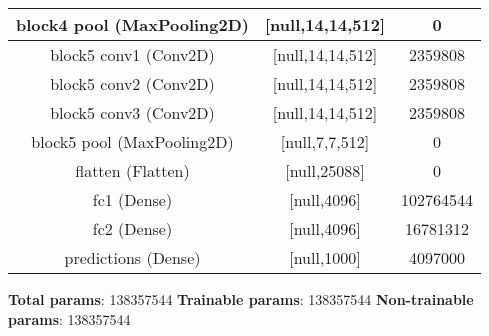 \begin{table}[!t]
\begin{tabular}{|c|c|c|}
    block4 pool (MaxPooling2D) & [null,14,14,512] & 0 \\
    \hline
    
    block5 conv1 (Conv2D) & [null,14,14,512] & 2359808 \\
    \hline
    
    block5 conv2 (Conv2D) & [null,14,14,512] & 2359808 \\
    \hline
    
    block5 conv3 (Conv2D) & [null,14,14,512] & 2359808 \\
    \hline
    
    block5 pool (MaxPooling2D) & [null,7,7,512] & 0 \\
    \hline
    
    flatten (Flatten) & [null,25088] & 0 \\
    \hline
    
    fc1 (Dense) & [null,4096] & 102764544 \\
    \hline
    
    fc2 (Dense) & [null,4096] & 16781312 \\
    \hline
    
    predictions (Dense) & [null,1000] & 4097000 \\
    \hline

  \end{tabular}

\end{table}

\linebreak
\textbf{Total params}: 138357544 \newline
\textbf{Trainable params}: 138357544 \newline
\textbf{Non-trainable params}: 138357544 \newline





